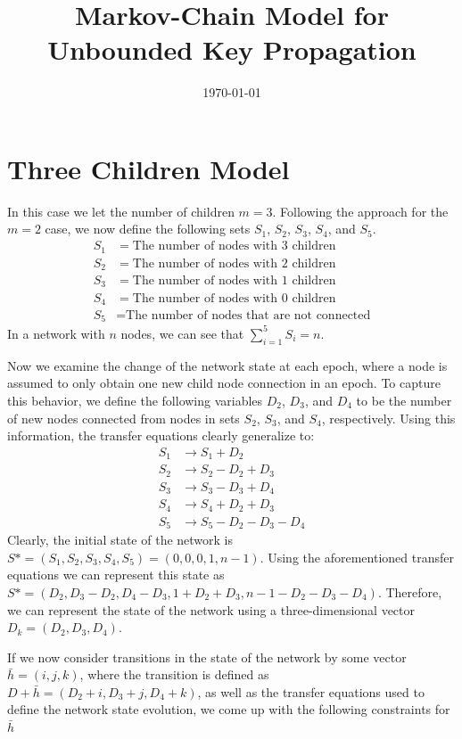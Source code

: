 \documentclass[a4paper,10pt]{article}
\title{Markov-Chain Model for Unbounded Key Propagation}
\author{}
\date{\today}
\begin{document}
\maketitle

\section{Three Children Model}
In this case we let the number of children $m = 3$. Following the approach for the 
$m = 2$ case, we now define the following sets $S_1$, $S_2$, $S_3$, $S_4$, and $S_5$.
\begin{align*}
S_1 & = \text{The number of nodes with $3$ children} \\
S_2 & = \text{The number of nodes with $2$ children} \\
S_3 & = \text{The number of nodes with $1$ children} \\
S_4 & = \text{The number of nodes with $0$ children} \\
S_5 & = \text{The number of nodes that are not connected}
\end{align*}
In a network with $n$ nodes, we can see that $\sum_{i = 1}^{5}S_i = n$. 

Now we examine the change of the network state at each epoch, where a node is
assumed to only obtain one new child node connection in an epoch. To capture this
behavior, we define the following variables $D_2$, $D_3$, and $D_4$ to be the
number of new nodes connected from nodes in sets $S_2$, $S_3$, and $S_4$, respectively. 
Using this information, the transfer equations clearly generalize to:
\begin{align*}
S_1 & \rightarrow S_1 + D_2 \\
S_2 & \rightarrow S_2 - D_2 + D_3 \\
S_3 & \rightarrow S_3 - D_3 + D_4 \\
S_4 & \rightarrow S_4 + D_2 + D_3 \\
S_5 & \rightarrow S_5 - D_2 - D_3 - D_4
\end{align*}
Clearly, the initial state of the network is $S* = (S_1, S_2, S_3, S_4, S_5) = (0, 0, 0, 1, n - 1)$.
Using the aforementioned transfer equations we can represent this state as 
$S* = (D_2, D_3 - D_2, D_4 - D_3, 1 + D_2 + D_3, n - 1 - D_2 - D_3 - D_4)$. 
Therefore, we can represent the state of the network using a three-dimensional vector
$D_k = (D_2, D_3, D_4)$. 

If we now consider transitions in the state of the network by some vector $\bar{h} = (i, j, k)$, where the 
transition is defined as $D + \bar{h} = (D_2 + i, D_3 + j, D_4 + k)$, as well as the transfer equations
used to define the network state evolution, we come up with the following constraints for $\bar{h}$
\end{document}
